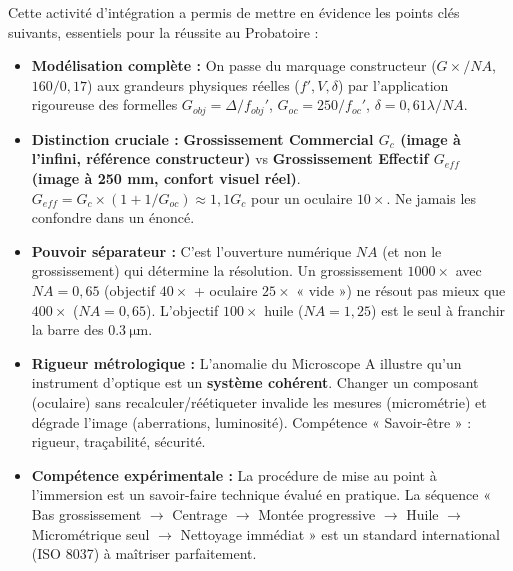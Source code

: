 \documentclass[11pt]{article}
\newcounter{popsec}
\newcounter{popsub}
\newcommand{\courssub}[1]{%
  \stepcounter{popsub}%
  \par\vspace{9pt}\noindent{\popxbold\fontsize{11.5}{13}\selectfont\color{popink}{\color{poporange}\thepopsec.\thepopsub}\hspace{6pt}#1}\par\nopagebreak\vspace{4pt}
}
\begin{document}
\courssub{Bilan de l'activité}
Cette activité d'intégration a permis de mettre en évidence les points clés suivants, essentiels pour la réussite au Probatoire :

\begin{aretenir}
\begin{itemize}
\item \textbf{Modélisation complète :} On passe du marquage constructeur ($G\times/NA$, $160/0,17$) aux grandeurs physiques réelles ($f', V, \delta$) par l'application rigoureuse des formelles $G_{obj}=\Delta/f_{obj}'$, $G_{oc}=250/f_{oc}'$, $\delta=0,61\lambda/NA$.
\item \textbf{Distinction cruciale :} \textbf{Grossissement Commercial $G_c$ (image à l'infini, référence constructeur)} vs \textbf{Grossissement Effectif $G_{eff}$ (image à 250 mm, confort visuel réel)}. $G_{eff} = G_c \times (1 + 1/G_{oc}) \approx 1,1 G_c$ pour un oculaire $10\times$. Ne jamais les confondre dans un énoncé.
\item \textbf{Pouvoir séparateur :} C'est l'ouverture numérique $NA$ (et non le grossissement) qui détermine la résolution. Un grossissement $1000\times$ avec $NA=0,65$ (objectif $40\times$ + oculaire $25\times$ « vide ») ne résout pas mieux que $400\times$ ($NA=0,65$). L'objectif $100\times$ huile ($NA=1,25$) est le seul à franchir la barre des $\SI{0,3}{\um}$.
\item \textbf{Rigueur métrologique :} L'anomalie du Microscope A illustre qu'un instrument d'optique est un \textbf{système cohérent}. Changer un composant (oculaire) sans recalculer/réétiqueter invalide les mesures (micrométrie) et dégrade l'image (aberrations, luminosité). Compétence « Savoir-être » : rigueur, traçabilité, sécurité.
\item \textbf{Compétence expérimentale :} La procédure de mise au point à l'immersion est un savoir-faire technique évalué en pratique. La séquence « Bas grossissement $\to$ Centrage $\to$ Montée progressive $\to$ Huile $\to$ Micrométrique seul $\to$ Nettoyage immédiat » est un standard international (ISO 8037) à maîtriser parfaitement.
\end{itemize}
\end{aretenir}
\end{document}
